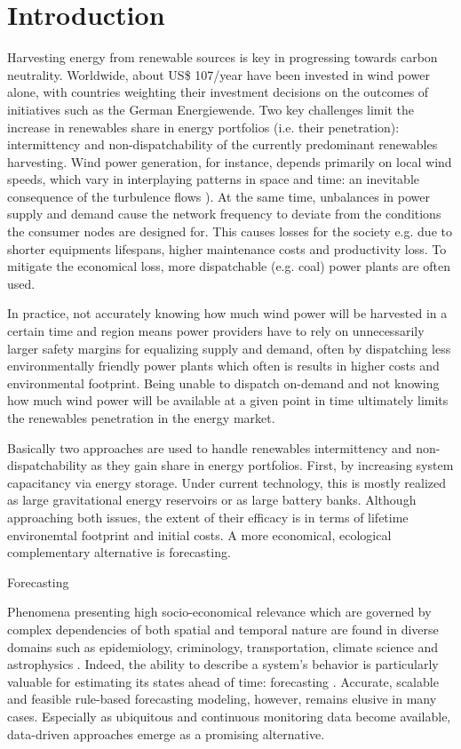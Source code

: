 \chapter{Introduction}
Harvesting energy from renewable sources is key in progressing towards carbon neutrality.
Worldwide, about US\$ 107/year have been invested in wind power alone, with countries weighting their investment decisions on the outcomes of initiatives such as the German Energiewende.
Two key challenges limit the increase in renewables share in energy portfolios (i.e. their penetration): intermittency and non-dispatchability of the currently predominant renewables harvesting.
Wind power generation, for instance, depends primarily on local wind speeds, which vary in interplaying patterns in space and time: an inevitable consequence of the turbulence flows \cite{pope2001turbulent}).
At the same time, unbalances in power supply and demand cause the network frequency to deviate from the conditions the consumer nodes are designed for.
This causes losses for the society e.g. due to shorter equipments lifespans, higher maintenance costs and productivity loss.
To mitigate the economical loss, more dispatchable (e.g. coal) power plants are often used.

In practice, not accurately knowing how much wind power will be harvested in a certain time and region means power providers have to rely on unnecessarily larger safety margins for equalizing supply and demand, often by dispatching less environmentally friendly power plants which often is results in higher costs and environmental footprint.
Being unable to dispatch on-demand and not knowing how much wind power will be available at a given point in time ultimately limits the renewables penetration in the energy market.

Basically two approaches are used to handle renewables intermittency and non-dispatchability as they gain share in energy portfolios.
First, by increasing system capacitancy via energy storage.
Under current technology, this is mostly realized as large gravitational energy reservoirs or as large battery banks.
Although approaching both issues, the extent of their efficacy is   in terms of lifetime environemtal footprint and initial costs.
A more economical, ecological complementary alternative is forecasting.

Forecasting


Phenomena presenting high socio-economical relevance which are governed by complex dependencies of both spatial and temporal nature are found in diverse domains such as epidemiology, criminology, transportation, climate science and astrophysics \cite{atluri2018datamining}.
Indeed, the ability to describe a system's behavior is particularly valuable for estimating its states ahead of time: forecasting \cite{armstrong2002principles}.
Accurate, scalable and feasible rule-based forecasting modeling, however, remains elusive in many cases.
Especially as ubiquitous and continuous monitoring data become available, data-driven approaches emerge as a promising alternative.

